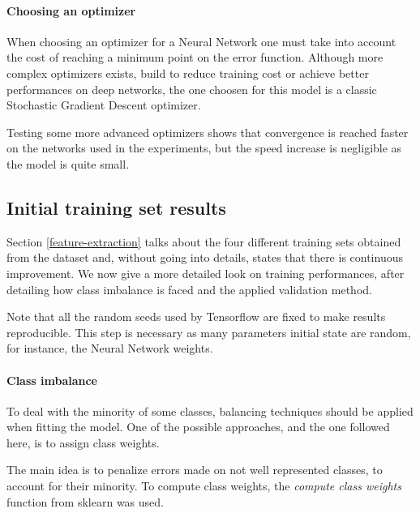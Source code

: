 \paragraph{Choosing an optimizer}
When choosing an optimizer for a Neural Network one must take into account the 
cost of reaching a minimum point on the error function.
Although more complex optimizers exists, build to reduce training 
cost or achieve better performances on deep networks, the one choosen 
for this model is a classic Stochastic Gradient Descent optimizer.

Testing some more advanced optimizers shows that convergence is reached faster on the 
networks used in the experiments, but the speed increase is negligible as the model
is quite small.

\subsection{Initial training set results}

Section \vref{feature-extraction} talks about the four different 
training sets obtained from the dataset and, without going into details, 
states that there is continuous improvement. 
We now give a more detailed look on training performances, after 
detailing how class imbalance is faced and the applied validation method.

Note that all the random seeds used by Tensorflow are fixed 
to make results reproducible. This step is necessary as many parameters initial 
state are random, for instance, the Neural Network weights.

\paragraph{Class imbalance}
To deal with the minority of some classes, balancing techniques should be 
applied when fitting the model. One of the possible approaches, and the one followed
here, is to assign class weights. 

The main idea is to penalize errors made on not well represented classes, to account 
for their minority. To compute class weights, the \emph{compute class weights} function
from sklearn was used.~\cite{classweight}

